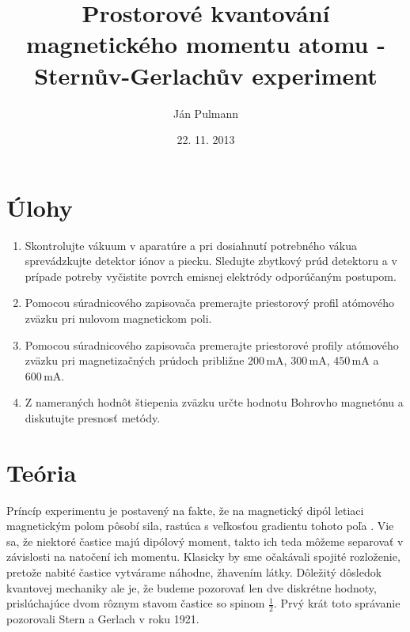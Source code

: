 \documentclass[a4paper, 10pt]{article}
\newcommand{\unit}[1]{\ensuremath{\, \mathrm{#1}}}
\begin{document}
\title{Prostorové kvantování magnetického momentu atomu - Sternův-Gerlachův experiment}
\author{Ján Pulmann}
\date{22. 11. 2013}
\maketitle
\section*{Úlohy}
\begin{enumerate}

	\item Skontrolujte vákuum v aparatúre a pri dosiahnutí potrebného vákua sprevádzkujte detektor iónov a piecku. Sledujte zbytkový prúd detektoru a v prípade potreby vyčistite povrch emisnej elektródy odporúčaným postupom.
    \item Pomocou súradnicového zapisovača premerajte priestorový profil atómového zväzku pri nulovom magnetickom poli.
    \item Pomocou súradnicového zapisovača premerajte priestorové profily atómového zväzku pri magnetizačných prúdoch približne $200\unit{mA}$, $300\unit{mA}$, $450\unit{mA}$ a $600\unit{mA}$.
    \item Z nameraných hodnôt štiepenia zväzku určte hodnotu Bohrovho magnetónu a diskutujte presnosť metódy.

 \end{enumerate}
 
\section*{Teória}
Príncíp experimentu je postavený na fakte, že na magnetický dipól letiaci magnetickým polom pôsobí sila, rastúca s veľkosťou gradientu tohoto poľa \cite{stud}. Vie sa, že niektoré častice majú dipólový moment, takto ich teda môžeme separovať v závislosti na natočení ich momentu. Klasicky by sme očakávali spojité rozloženie, pretože nabité častice vytvárame náhodne, žhavením látky. Dôležitý dôsledok kvantovej mechaniky ale je, že budeme pozorovať len dve diskrétne hodnoty, prislúchajúce dvom rôznym stavom častice so spinom $\frac 12$. Prvý krát toto správanie pozorovali Stern a Gerlach v roku 1921. \cite{stud}
\end{document}
